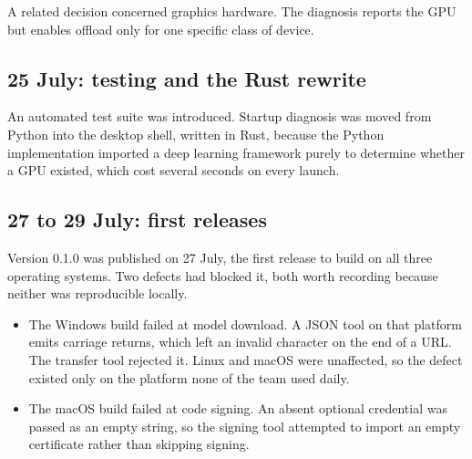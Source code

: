 \documentclass[11pt,a4paper]{article}
\begin{document}
A related decision concerned graphics hardware. The diagnosis reports the GPU
but enables offload only for one specific class of device.


\subsection{25 July: testing and the Rust rewrite}

An automated test suite was introduced. Startup diagnosis was moved from Python
into the desktop shell, written in Rust, because the Python implementation
imported a deep learning framework purely to determine whether a GPU existed,
which cost several seconds on every launch.


\subsection{27 to 29 July: first releases}

Version 0.1.0 was published on 27 July, the first release to build on all three
operating systems. Two defects had blocked it, both worth recording because
neither was reproducible locally.

\begin{itemize}[leftmargin=*]
  \item The Windows build failed at model download. A JSON tool on that platform
        emits carriage returns, which left an invalid character on the end of a
        URL. The transfer tool rejected it. Linux and macOS were unaffected, so
        the defect existed only on the platform none of the team used daily.
  \item The macOS build failed at code signing. An absent optional credential
        was passed as an empty string, so the signing tool attempted to import
        an empty certificate rather than skipping signing.
\end{itemize}
\end{document}
